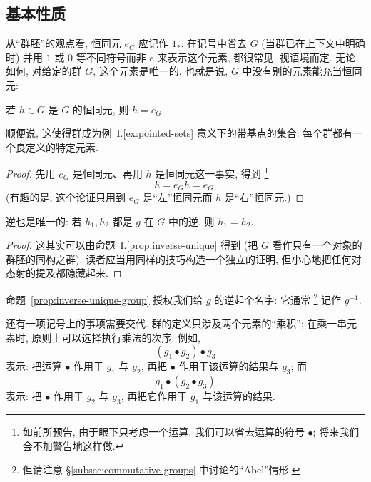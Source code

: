 \subsection{基本性质}
\label{subsec:basic-properties-group}

从``群胚''的观点看, 恒同元 $e_G$ 应记作 $1_{*}$. 在记号中省去 $G$ (当群已在上下文中明确时) 并用 $1$ 或 $0$ 等不同符号而非 $e$ 来表示这个元素, 都很常见, 视语境而定. 无论如何, 对给定的群 $G$, 这个元素是唯一的. 也就是说, $G$ 中没有别的元素能充当恒同元:

\begin{proposition}
\label{prop:identity-unique}
若 $h \in G$ 是 $G$ 的恒同元, 则 $h = e_G$.
\end{proposition}

顺便说, 这使得群成为例~I.\ref{ex:pointed-sets} 意义下的带基点的集合: 每个群都有一个良定义的特定元素.

\begin{proof}
先用 $e_G$ 是恒同元、再用 $h$ 是恒同元这一事实, 得到%
\footnote{如前所预告, 由于眼下只考虑一个运算, 我们可以省去运算的符号 $\bullet$; 将来我们会不加警告地这样做.}%
\[
h = e_G h = e_G.
\]
(有趣的是, 这个论证只用到 $e_G$ 是``左''恒同元而 $h$ 是``右''恒同元.)
\end{proof}

\begin{proposition}
\label{prop:inverse-unique-group}
逆也是唯一的: 若 $h_1, h_2$ 都是 $g$ 在 $G$ 中的逆, 则 $h_1 = h_2$.
\end{proposition}

\begin{proof}
这其实可以由命题~I.\ref{prop:inverse-unique} 得到 (把 $G$ 看作只有一个对象的群胚的同构之群). 读者应当用同样的技巧构造一个独立的证明, 但小心地把任何对态射的提及都隐藏起来.
\end{proof}

命题~\ref{prop:inverse-unique-group} 授权我们给 $g$ 的逆起个名字: 它通常%
\footnote{但请注意 \S\ref{subsec:commutative-groups} 中讨论的``Abel''情形.}%
记作 $g^{-1}$.

还有一项记号上的事项需要交代. 群的定义只涉及两个元素的``乘积''; 在乘一串元素时, 原则上可以选择执行乘法的次序. 例如,
\[
(g_1 \bullet g_2) \bullet g_3
\]
表示: 把运算 $\bullet$ 作用于 $g_1$ 与 $g_2$, 再把 $\bullet$ 作用于该运算的结果与 $g_3$; 而
\[
g_1 \bullet (g_2 \bullet g_3)
\]
表示: 把 $\bullet$ 作用于 $g_2$ 与 $g_3$, 再把它作用于 $g_1$ 与该运算的结果.

